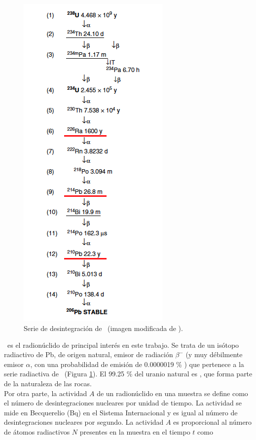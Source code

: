 	\subsection{\PbCero}\label{SubSec-210Pb}
\begin{figure}
 \centering
 \includegraphics[height=0.8\textheight]{Imagenes/UDacay.png}
 \caption{Serie de desintegración de \UDosTresOcho\, (imagen modificada de \cite{gilmore2008}).}\label{Fig-SerieUranio}
\end{figure}	
\PbCero\, es el radionúclido de principal interés en este trabajo. Se trata de un isótopo radiactivo de Pb, de origen natural, emisor de radiación $\beta^{-}$ (y muy débilmente emisor $\alpha$, con una probabilidad de emisión de 0.0000019 \% \cite{DataDecayEvaluation}) que pertenece a la serie radiactiva de \UDosTresOcho\ (Figura \ref{Fig-SerieUranio}). El 99.25 \% del uranio natural es \UDosTresOcho, que forma parte de la naturaleza de las rocas.
\vspace{0.5cm}
\\
Por otra parte, la actividad $A$ de un radionúclido en una muestra se define como el número de desintegraciones nucleares por unidad de tiempo. La actividad se mide en Becquerelio (Bq) en el Sistema Internacional y es igual al número de desintegraciones nucleares por segundo. La actividad $A$ es proporcional al número de átomos radiactivos $N$ presentes en la muestra en el tiempo $t$ como
